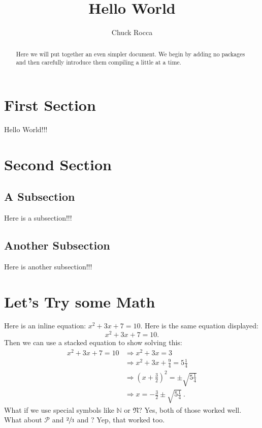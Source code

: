 \documentclass[twoside]{article}
\title{Hello World}
\author{Chuck Rocca}
\begin{document}
\maketitle

\markboth{\thetitle}{\theauthor}


\begin{abstract}
	Here we will put together an even simpler document.  We begin by adding no packages and then carefully introduce them compiling a little at a time.
\end{abstract}

\section{First Section}

Hello World!!!

\section{Second Section}

\subsection{A Subsection}

Here is a subsection!!!

\subsection{Another Subsection}

Here is another subsection!!!

\section{Let's Try some Math}

Here is an inline equation: \(x^2+3x+7=10\).  Here is the same equation displayed: \[x^2+3x+7=10.\] Then we can use a stacked equation to show solving this:
\begin{align}
	x^2+3x+7=10 &\Rightarrow x^2+3x=3\\
		&\Rightarrow x^2+3x+\frac{9}{4}=5\frac{1}{4}\\
		&\Rightarrow \left(x+\frac{3}{2}\right)^2=\pm\sqrt{5\frac{1}{4}}\\
		&\Rightarrow x=-\frac{3}{2}\pm\sqrt{5\frac{1}{4}}\ .
\end{align}
What if we use special symbols like \(\mathbb{N}\) or \(\mathfrak{N}\)?  Yes, both of those worked well.  What about \(\mathcal{P}\) and \(\sfrac{2}{3}\) and \XSolidBrush?  Yep, that worked too.
\end{document}
